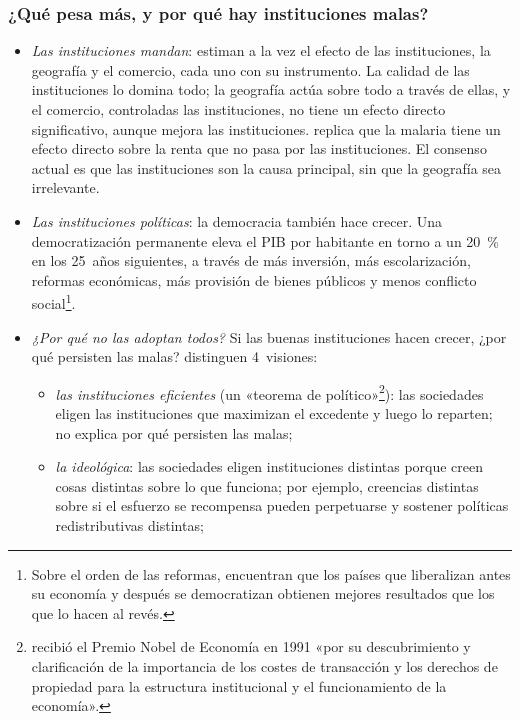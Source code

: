 \documentclass[11pt]{article}
\begin{document}
\subsubsection{¿Qué pesa más, y por qué hay instituciones malas?}\label{sec:instituciones-debate}

\begin{itemize}
\item \emph{Las instituciones mandan}: \textcite{RodrikSubramanianTrebbi2004} estiman a la vez el efecto de las instituciones, la geografía y el comercio, cada uno con su instrumento. La calidad de las instituciones lo domina todo; la geografía actúa sobre todo a través de ellas, y el comercio, controladas las instituciones, no tiene un efecto directo significativo, aunque mejora las instituciones. \textcite{Sachs2003} replica que la malaria tiene un efecto directo sobre la renta que no pasa por las instituciones. El consenso actual es que las instituciones son la causa principal, sin que la geografía sea irrelevante.
\item \emph{Las instituciones políticas}: la democracia también hace crecer. Una democratización permanente eleva el PIB por habitante en torno a un 20~\% en los 25~años siguientes, a través de más inversión, más escolarización, reformas económicas, más provisión de bienes públicos y menos conflicto social\nocite{AcemogluNaiduRestrepoRobinson2019}\footnote{Sobre el orden de las reformas, \textcite{GiavazziTabellini2005} encuentran que los países que liberalizan antes su economía y después se democratizan obtienen mejores resultados que los que lo hacen al revés.}.
\item \emph{¿Por qué no las adoptan todos?} Si las buenas instituciones hacen crecer, ¿por qué persisten las malas? \textcite{AcemogluJohnsonRobinson2005} distinguen 4~visiones:
  \begin{itemize}
  \item \emph{las instituciones eficientes} (un «teorema de  político»\footnote{ recibió el Premio Nobel de Economía en 1991 «por su descubrimiento y clarificación de la importancia de los costes de transacción y los derechos de propiedad para la estructura institucional y el funcionamiento de la economía»\nocite{Nobel1991Coase}.}): las sociedades eligen las instituciones que maximizan el excedente y luego lo reparten; no explica por qué persisten las malas;
  \item \emph{la ideológica}: las sociedades eligen instituciones distintas porque creen cosas distintas sobre lo que funciona\nocite{AcemogluJohnsonRobinson2005}; por ejemplo, creencias distintas sobre si el esfuerzo se recompensa pueden perpetuarse y sostener políticas redistributivas distintas\nocite{Piketty1995};

\end{itemize}
\end{itemize}
\end{document}
